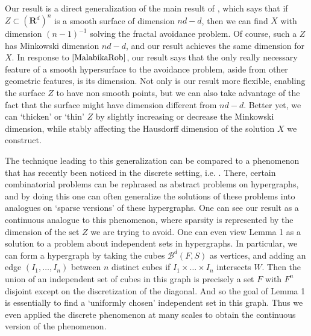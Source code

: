 \documentclass[usenames,dvipsnames]{article}
\theoremstyle{plain}
\theoremstyle{plain}
\begin{document}
Our result is a direct generalization of the main result of \cite{MalabikaRob}, which says that if $Z \subset (\mathbf{R}^d)^n$ is a smooth surface of dimension $nd - d$, then we can find $X$ with dimension $(n-1)^{-1}$ solving the fractal avoidance problem. Of course, such a $Z$ has Minkowski dimension $nd - d$, and our result achieves the same dimension for $X$. In response to $\cite{MalabikaRob}$, our result says that the only really necessary feature of a smooth hypersurface to the avoidance problem, aside from other geometric features, is its dimension. Not only is our result more flexible, enabling the surface $Z$ to have non smooth points, but we can also take advantage of the fact that the surface might have dimension different from $nd - d$. Better yet, we can `thicken' or `thin' $Z$ by slightly increasing or decrease the Minkowski dimension, while stably affecting the Hausdorff dimension of the solution $X$ we construct.

The technique leading to this generalization can be compared to a phenomenon that has recently been noticed in the discrete setting, i.e. \cite{BaloghMorrisSamotij}. There, certain combinatorial problems can be rephrased as abstract problems on hypergraphs, and by doing this one can often generalize the solutions of these problems into analogues on `sparse versions' of these hypergraphs. One can see our result as a continuous analogue to this phenomenon, where sparsity is represented by the dimension of the set $Z$ we are trying to avoid. One can even view Lemma 1 as a solution to a problem about independent sets in hypergraphs. In particular, we can form a hypergraph by taking the cubes $\mathcal{B}^d(F,S)$ as vertices, and adding an edge $(I_1, \dots, I_n)$ between $n$ distinct cubes if $I_1 \times \dots \times I_n$ intersects $W$. Then the union of an independent set of cubes in this graph is precisely a set $F$ with $F^n$ disjoint except on the discretization of the diagonal. And so the goal of Lemma 1 is essentially to find a `uniformly chosen' independent set in this graph. Thus we even applied the discrete phenomenon at many scales to obtain the continuous version of the phenomenon.
\end{document}
